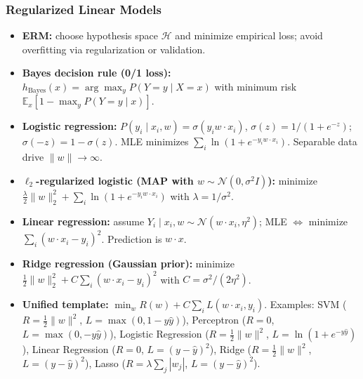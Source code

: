\documentclass[10pt]{article}
\begin{document}
\begin{multicols}{2}
\subsubsection*{Regularized Linear Models}
\begin{itemize}
    \item \textbf{ERM:} choose hypothesis space $\mathcal{H}$ and minimize empirical loss; avoid overfitting via regularization or validation.
    \item \textbf{Bayes decision rule (0/1 loss):} $h_{\text{Bayes}}(x)=\arg\max_y P(Y=y\mid X=x)$ with minimum risk $\mathbb{E}_x[1-\max_y P(Y=y\mid x)]$.
    \item \textbf{Logistic regression:} $P(y_i\mid x_i,w)=\sigma(y_i w\cdot x_i)$, $\sigma(z)=1/(1+e^{-z})$; $\sigma(-z)=1-\sigma(z)$. MLE minimizes $\sum_i\ln(1+e^{-y_i w\cdot x_i})$. Separable data drive $\|w\|\rightarrow\infty$.
    \item \textbf{$\ell_2$-regularized logistic (MAP with $w\sim\mathcal{N}(0,\sigma^2I)$):} minimize $\frac{\lambda}{2}\|w\|_2^2+\sum_i\ln(1+e^{-y_i w\cdot x_i})$ with $\lambda=1/\sigma^2$.
    \item \textbf{Linear regression:} assume $Y_i\mid x_i,w\sim\mathcal{N}(w\cdot x_i,\eta^2)$; MLE $\Leftrightarrow$ minimize $\sum_i (w\cdot x_i - y_i)^2$. Prediction is $w\cdot x$.
    \item \textbf{Ridge regression (Gaussian prior):} minimize $\frac{1}{2}\|w\|_2^2 + C\sum_i (w\cdot x_i - y_i)^2$ with $C=\sigma^2/(2\eta^2)$.
    \item \textbf{Unified template:} $\min_w R(w)+C\sum_i L(w\cdot x_i,y_i)$. Examples: SVM ($R=\tfrac{1}{2}\|w\|^2$, $L=\max(0,1-y\hat{y})$), Perceptron ($R=0$, $L=\max(0,-y\hat{y})$), Logistic Regression ($R=\tfrac{1}{2}\|w\|^2$, $L=\ln(1+e^{-y\hat{y}})$), Linear Regression ($R=0$, $L=(y-\hat{y})^2$), Ridge ($R=\tfrac{1}{2}\|w\|^2$, $L=(y-\hat{y})^2$), Lasso ($R=\lambda\sum_j |w_j|$, $L=(y-\hat{y})^2$).
\end{itemize}

\end{multicols}
\end{document}
